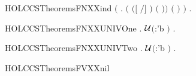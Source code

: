 \begin{SaveVerbatim}{HOLCCSTheoremsFNXXind}
       \ensuremath{(}\HOLSymConst{\HOLTokenForall{}}  .
            \ensuremath{(}   \HOLSymConst{\HOLTokenImp{}}  \ensuremath{(}\ensuremath{[}  \ensuremath{/}\ensuremath{]} \ensuremath{)} \ensuremath{(}  \ensuremath{)}\ensuremath{)} \HOLSymConst{\HOLTokenImp{}}
             \ensuremath{(}  \ensuremath{)} \ensuremath{)} \HOLSymConst{\HOLTokenImp{}}
       \HOLSymConst{\HOLTokenForall{}} .   
\end{SaveVerbatim}
\newcommand{\HOLCCSTheoremsFNXXind}{\UseVerbatim{HOLCCSTheoremsFNXXind}}
\begin{SaveVerbatim}{HOLCCSTheoremsFNXXUNIVOne}
\HOLTokenTurnstile{} \HOLSymConst{\HOLTokenForall{}}.   \HOLSymConst{\HOLTokenNotEqual{}} \ensuremath{{\cal{U}}}\ensuremath{(}:'b \ensuremath{)} \HOLSymConst{\HOLTokenImp{}} \HOLSymConst{\HOLTokenExists{}}.  \HOLConst{\HOLTokenNotIn{}}  
\end{SaveVerbatim}
\newcommand{\HOLCCSTheoremsFNXXUNIVOne}{\UseVerbatim{HOLCCSTheoremsFNXXUNIVOne}}
\begin{SaveVerbatim}{HOLCCSTheoremsFNXXUNIVTwo}
\HOLTokenTurnstile{} \HOLSymConst{\HOLTokenForall{}} .
         \HOLConst{\HOLTokenUnion{}}   \HOLSymConst{\HOLTokenNotEqual{}} \ensuremath{{\cal{U}}}\ensuremath{(}:'b \ensuremath{)} \HOLSymConst{\HOLTokenImp{}}
       \HOLSymConst{\HOLTokenExists{}}.  \HOLConst{\HOLTokenNotIn{}}   \HOLSymConst{\HOLTokenConj{}}  \HOLConst{\HOLTokenNotIn{}}  
\end{SaveVerbatim}
\newcommand{\HOLCCSTheoremsFNXXUNIVTwo}{\UseVerbatim{HOLCCSTheoremsFNXXUNIVTwo}}
\begin{SaveVerbatim}{HOLCCSTheoremsFVXXnil}
\HOLTokenTurnstile{}   \HOLSymConst{\ensuremath{=}} \HOLTokenLeftbrace{}\HOLTokenRightbrace{}
\end{SaveVerbatim}
